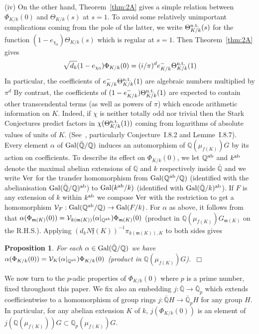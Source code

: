 \documentclass[12pt]{article}
\newtheorem{prop}{Proposition}[section]
\newcounter{rem}[section]%
\newcommand{\barbbQ}{\ensuremath{\bar{\bbQ}}}
\newcommand{\bbQ}{\ensuremath{\mathbb{Q}}}
\newcommand{\cV}{\ensuremath{\mathcal{V}}}
\newcommand{\ePf}{\hspace*{\fill}~$\Box$\vertsp\par}%
\newcommand{\ff}{\ensuremath{\mathfrak{f}}}
\newcommand{\fm}{\ensuremath{\mathfrak{m}}}
\newcommand{\Gal}{{\rm Gal}}
\newcommand{\inv}{^{-1}}%
\newcommand{\rem}{\refstepcounter{rem}\noindent{\sc Remark \therem}}%
\renewcommand{\therem}{\thesection.\arabic{rem}}
\newcommand{\vertsp}{\vspace{1ex}}
\newcommand{\PhiKko}{\ensuremath{\Phi_{K/k}(0)}}
\newcommand{\ThetaKk}{\ensuremath{\Theta_{K/k}}}
\begin{document}
(iv) On the other hand, Theorem~\ref{thm:2A} gives a simple relation between $\PhiKko$
and $\Theta_{K/k}(s)$ at $s=1$. To avoid some relatively unimportant complications coming
from the pole of the latter, we write $\Theta^{\rm n.t.}_{K/k}(s)$ for
the function $(1-e_{\chi_0})\ThetaKk(s)$ which is regular at $s=1$. Then
Theorem~\ref{thm:2A}  gives
\[
\sqrt{d_k}(1-e_{\chi_0})\PhiKko=(i/\pi)^d e^-_{K/k}\Theta^{\rm n.t.}_{K/k}(1)
\]
In particular, the coefficients of $e^-_{K/k}\Theta^{\rm n.t.}_{K/k}(1)$ are algebraic numbers
multiplied by $\pi^d$
By contrast, the coefficients of $(1-e^-_{K/k})\Theta^{\rm n.t.}_{K/k}(1)$
are expected to contain other transcendental terms (as well as powers of $\pi$)
which encode arithmetic information on $K$.
Indeed, if $\chi$ is neither totally odd nor trivial then
the Stark Conjectures predict factors in
$\chi(\Theta^{\rm n.t.}_{K/k}(1))$
coming from logarithms of absolute values of
units of $K$. (See~\cite{Tate}, particularly Conjecture~I.8.2
and Lemme~I.8.7).
\vspace{1ex}\\
Every element $\alpha$ of $\Gal(\barbbQ/\bbQ)$
induces an automorphism of $\bbQ(\mu_{f(K)})G$ by its action on coefficients.
To describe its effect on $\PhiKko$, we
let $\bbQ^{\rm ab}$ and $k^{\rm ab}$ denote the maximal abelian extensions of
$\bbQ$ and $k$ respectively inside $\barbbQ$ and we write
${\rm Ver}$ for the transfer homomorphism from $\Gal(\bbQ^{\rm ab}/\bbQ)$
(identified with the abelianisation $\Gal(\barbbQ/\bbQ)^{\rm ab}$) to
$\Gal(k^{\rm ab}/k)$ (identified with $\Gal(\barbbQ/k)^{\rm ab}$).
If $F$ is any extension of $k$ within
$k^{\rm ab}$ we compose ${\rm Ver}$ with the restriction
to get a homomorphism $\cV_F:\Gal(\bbQ^{\rm ab}/\bbQ)\rightarrow\Gal(F/k)$.
For $\alpha$ as above, it follows from~\cite[Prop.~3.1]{zetap1}
that $\alpha(\Phi_{\fm(K)}(0))=\cV_{k(\fm(K))}(\alpha|_{\bbQ^{\rm ab}})\Phi_{\fm(K)}(0)$
(product in $\bbQ(\mu_{f(K)})G_{\fm(K)}$ on the R.H.S.). Applying
$(d_k N\ff(K))\inv\pi_{k(\fm(K)),K}$ to both sides gives
\begin{prop}\label{prop:2B} For each $\alpha\in\Gal(\barbbQ/\bbQ)$ we have
$\alpha(\PhiKko)=\cV_{K}(\alpha|_{\bbQ^{\rm ab}})\PhiKko$ (product in $\bbQ(\mu_{f(K)})G$).\ePf
\end{prop}
We now turn to the $p$-adic properties of $\PhiKko$ where
$p$ is a prime number, fixed throughout this paper. We fix also an embedding
$j:\bar{\bbQ}\rightarrow\bar{\bbQ}_p$ which extends
coefficientwise to a homomorphism of group rings
$j:\bar{\bbQ}H\rightarrow\bar{\bbQ}_pH$ for any group $H$.
In particular, for any abelian extension $K$ of $k$,
$j(\PhiKko)$ is an element of $j(\bbQ(\mu_{f(K)}))G\subset\bbQ_p(\mu_{f(K)})G$.
\end{document}
